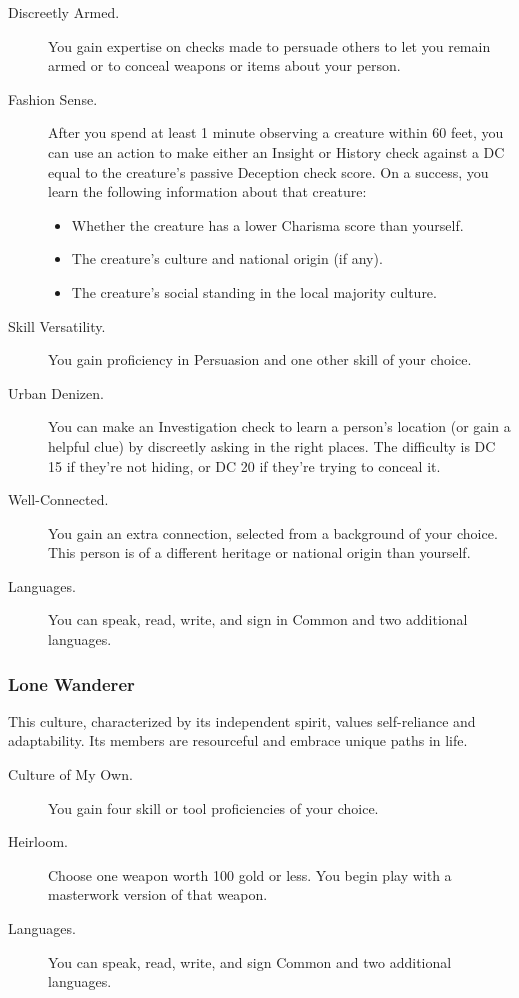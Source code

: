 \begin{description}
\item[Discreetly Armed.]
You gain expertise on checks made to persuade others to let you remain
armed or to conceal weapons or items about your person.
\item[Fashion Sense.]
After you spend at least 1 minute observing a creature within 60 feet,
you can use an action to make either an Insight or History check against
a DC equal to the creature's passive Deception check score. On a
success, you learn the following information about that creature:

\begin{itemize}
\item
  Whether the creature has a lower Charisma score than yourself.
\item
  The creature's culture and national origin (if any).
\item
  The creature's social standing in the local majority culture.
\end{itemize}
\item[Skill Versatility.]
You gain proficiency in Persuasion and one other skill of your choice.
\item[Urban Denizen.]
You can make an Investigation check to learn a person's location (or
gain a helpful clue) by discreetly asking in the right places. The
difficulty is DC 15 if they're not hiding, or DC 20 if they're trying to
conceal it.
\item[Well-Connected.]
You gain an extra connection, selected from a background of your choice.
This person is of a different heritage or national origin than yourself.
\item[Languages.]
You can speak, read, write, and sign in Common and two additional
languages.
\end{description}

\subsubsection{Lone Wanderer}\label{culture-lone-wanderer}

This culture, characterized by its independent spirit, values
self-reliance and adaptability. Its members are resourceful and embrace
unique paths in life.

\begin{description}
\item[Culture of My Own.]
You gain four skill or tool proficiencies of your choice.
\item[Heirloom.]
Choose one weapon worth 100 gold or less. You begin play with a
masterwork version of that weapon.
\item[Languages.]
You can speak, read, write, and sign Common and two additional
languages.
\end{description}

